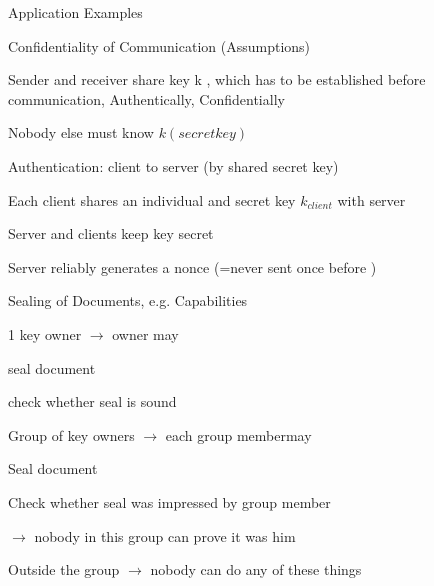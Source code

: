 \documentclass[a4paper]{article}
\begin{document}
\begin{multicols}{3}
    Application Examples
    \begin{enumerate*}
        \item Confidentiality of Communication (Assumptions)
        \begin{itemize*}
            \item Sender and receiver share key k , which has to be established before communication, Authentically, Confidentially
            \item Nobody else must know $k(secretkey)$
        \end{itemize*}
        \item Authentication: client to server (by shared secret key)
        \begin{itemize*}
            \item Each client shares an individual and secret key $k_{client}$ with server
            \item Server and clients keep key secret
            \item Server reliably generates a nonce (=never sent once before )
        \end{itemize*}
        \item Sealing of Documents, e.g. Capabilities
        \begin{itemize*}
            \item 1 key owner $\rightarrow$ owner may
            \begin{itemize*}
                \item seal document
                \item check whether seal is sound
            \end{itemize*}
            \item Group of key owners $\rightarrow$ each group membermay
            \begin{itemize*}
                \item Seal document
                \item Check whether seal was impressed by group member
                \item[$\rightarrow$] nobody in this group can prove it was him
            \end{itemize*}
            \item Outside the group $\rightarrow$ nobody can do any of these things
        \end{itemize*}
    \end{enumerate*}


\end{multicols}
\end{document}
